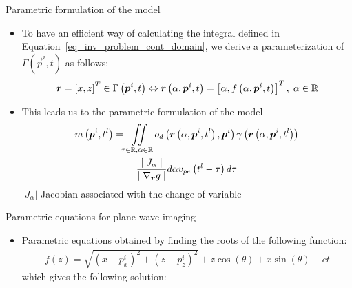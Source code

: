 {\begin{block}{Parametric formulation of the model}
\begin{itemize}
	$g\left(\vec{r}, \vec{p}^i, t\right) = t - t_{Tx} \left(\vec{r}\right) - t_{Rx} \left(\vec{r}, \vec{p}^i\right)$, $\Gamma \left(\vec{p}^i, t \right) = \left\lbrace \vec{r} \in \Omega \; | \; g\left(\vec{r}, \vec{p}^i, t \right) = 0 \right\rbrace$, $\nabla_{\vec{r}} g$ denotes the gradient of $g$ w.r.t $\vec{r}$, $d\sigma \left(\vec{r}\right)$ is the measure over the 1D-curve $\Gamma \left(\vec{p}^i, t \right)$
	\item To have an efficient way of calculating the integral defined in Equation~\eqref{eq_inv_problem_cont_domain}, we derive a parameterization of $\Gamma \left(\vec{p}^i, t \right)$ as follows:
	\begin{equation}
	\label{eq_param_equation_generic}
	\bm{r} = \left[x, z\right]^T \in \Gamma \left(\bm{p}^i, t \right) \Leftrightarrow \bm{r}\left(\alpha, \bm{p}^i, t\right)= \left[\alpha, f\left(\alpha, \bm{p}^i, t \right)\right]^T, \; \alpha \in \mathbb{R}
	\end{equation}
	\item This leads us to the parametric formulation of the model
	\begin{multline}
	\label{eq_inv_problem_cont_domain_parameterized}
	m\left(\bm{p}^i, t^l\right) = \iint \limits_{\tau \in \mathbb{R}, \alpha \in \mathbb{R}} o_d\left(\bm{r}\left(\alpha, \bm{p}^i, t^l\right), \bm{p}^i\right)\gamma \left(\bm{r}\left(\alpha, \bm{p}^i, t^l\right)\right) \\ \frac{\mid J_\alpha \mid}{\mid \nabla_{\bm{r}} g \mid} d\alpha v_{pe} \left(t^l - \tau\right) d \tau
	\end{multline}
	$|J_\alpha|$ Jacobian associated with the change of variable
\end{itemize}	
\end{block}
\vfill
\begin{block}{Parametric equations for plane wave imaging}
	\begin{itemize}
		\item Parametric equations obtained by finding the roots of the following function:
		\begin{align}
		f \left(z\right) = \sqrt{\left(x-p^i_x\right)^2 + \left(z-p^i_z\right)^2} + z \cos\left(\theta\right)  + x \sin\left(\theta\right) - ct
		\end{align}
		which gives the following solution:
		\begin{align}

\end{align}
\end{itemize}
\end{block}}
